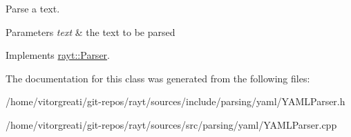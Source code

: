 Parse a text. 


\begin{DoxyParams}{Parameters}
{\em text} & the text to be parsed \\
\hline
\end{DoxyParams}


Implements \mbox{\hyperlink{classrayt_1_1_parser_a70296f0148b00574553a519156806fef}{rayt\+::\+Parser}}.



The documentation for this class was generated from the following files\+:\begin{DoxyCompactItemize}
\item 
/home/vitorgreati/git-\/repos/rayt/sources/include/parsing/yaml/Y\+A\+M\+L\+Parser.\+h\item 
/home/vitorgreati/git-\/repos/rayt/sources/src/parsing/yaml/Y\+A\+M\+L\+Parser.\+cpp\end{DoxyCompactItemize}
